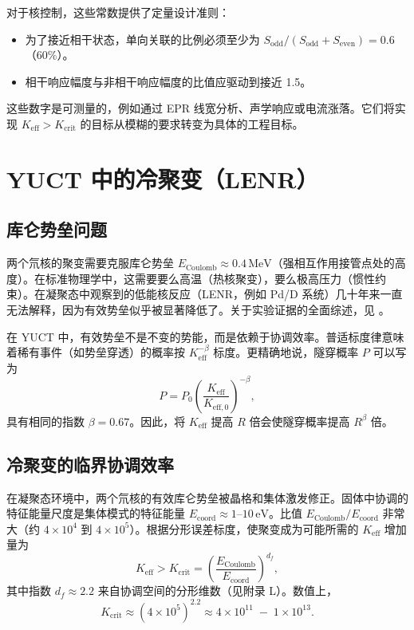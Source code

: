 \documentclass[12pt]{article}
\theoremstyle{remark}
\newcommand{\Keff}{K_{\mathrm{eff}}}
\newcommand{\Keffzero}{K_{\mathrm{eff},0}}
\newcommand{\df}{d_{\!f}}
\newcommand{\Kcrit}{K_{\mathrm{crit}}}
\newcommand{\Sodd}{S_{\mathrm{odd}}}
\newcommand{\Seven}{S_{\mathrm{even}}}
\begin{document}
	对于核控制，这些常数提供了定量设计准则：
	\begin{itemize}
		\item 为了接近相干状态，单向关联的比例必须至少为 \(\Sodd/(\Sodd+\Seven)=0.6\)（60\%）。
		\item 相干响应幅度与非相干响应幅度的比值应驱动到接近 1.5。
	\end{itemize}
	这些数字是可测量的，例如通过 EPR 线宽分析、声学响应或电流涨落。它们将实现 \(\Keff > \Kcrit\) 的目标从模糊的要求转变为具体的工程目标。
	
	\section{YUCT 中的冷聚变（LENR）}
	\label{sec:fusion}
	
	\subsection{库仑势垒问题}
	
	两个氘核的聚变需要克服库仑势垒 \(E_{\text{Coulomb}} \approx 0.4\,\text{MeV}\)（强相互作用接管点处的高度）。在标准物理学中，这需要要么高温（热核聚变），要么极高压力（惯性约束）。在凝聚态中观察到的低能核反应（LENR，例如 Pd/D 系统）几十年来一直无法解释，因为有效势垒似乎被显著降低了。关于实验证据的全面综述，见 \cite{Storms2014, Nagel2019}。
	
	在 YUCT 中，有效势垒不是不变的势能，而是依赖于协调效率。普适标度律意味着稀有事件（如势垒穿透）的概率按 \(\Keff^{-\beta}\) 标度。更精确地说，隧穿概率 \(P\) 可以写为
	\begin{equation}
		P = P_0 \left( \frac{\Keff}{\Keffzero} \right)^{-\beta},
		\label{eq:tunnel}
	\end{equation}
	具有相同的指数 \(\beta = 0.67\)。因此，将 \(\Keff\) 提高 \(R\) 倍会使隧穿概率提高 \(R^{\beta}\) 倍。
	
	\subsection{冷聚变的临界协调效率}
	
	在凝聚态环境中，两个氘核的有效库仑势垒被晶格和集体激发修正。固体中协调的特征能量尺度是集体模式的特征能量 \(E_{\mathrm{coord}} \approx 1\)–\(10\,\text{eV}\)。比值 \(E_{\text{Coulomb}}/E_{\mathrm{coord}}\) 非常大（约 \(4\times10^4\) 到 \(4\times10^5\)）。根据分形误差标度，使聚变成为可能所需的 \(\Keff\) 增加量为
	\begin{equation}
		\Keff > \Kcrit = \left( \frac{E_{\text{Coulomb}}}{E_{\mathrm{coord}}} \right)^{\df},
		\label{eq:Kcrit}
	\end{equation}
	其中指数 \(\df \approx 2.2\) 来自协调空间的分形维数（见附录 L）。数值上，
	\[
	\Kcrit \approx (4\times10^5)^{2.2} \approx 4\times10^{11} \;-\; 1\times10^{13}.
	\]
	
\end{document}
